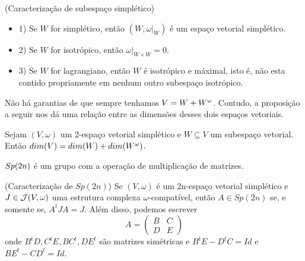\documentclass{beamer}
\begin{document}
\begin{frame}
	\begin{lema}
		(Caracterização de subespaço simplético)
	\end{lema}
	\begin{itemize}
		\item 1) Se $W$ for simplético, então $(W, \omega|_{W})$ é um espaço vetorial simplético.
		
		\item 2) Se $W$ for isotrópico, então $\omega|_{W\times W} = 0$.
		
		\item 3) Se $W$ for lagrangiano, então $W$ é isotrópico e máximal, isto é, não esta contido propriamente em nenhum outro subespaço isotrópico. 
	\end{itemize}
	Não há garantias de que sempre tenhamos $V = W + W^{\omega}$. Contudo, a proposição a seguir nos dá uma relação entre as dimensões desses dois espaços vetoriais.
	
	\begin{proposicao}
		Sejam $(V,\omega)$ um 2-espaço vetorial simplético e $W \subseteq V$ um subespaço vetorial. Então $dim(V) = dim(W) + dim(W^{\omega})$.
	\end{proposicao}
\end{frame}

\begin{frame}
	\begin{proposicao}
		$Sp(2n)$ é um grupo com a operação de multiplicação de matrizes.
	\end{proposicao}
	
	\begin{lema}
		(Caracterização de $Sp(2n)$) Se $(V, \omega)$ é um 2n-espaço vetorial simplético e $J \in \mathcal{J}(V, \omega)$ uma estrutura complexa $\omega$-compatível, então $A\in Sp(2n)$ se, e somente se, $A^{t}JA = J$. Além disso, podemos escrever 
		$$
		A=
		\left(
		\begin{array}{cc}
		B & C
		\\
		D & E
		\end{array}
		\right)
		$$
		onde $B^{t}D, C^{t}E, BC^{t}, DE^{t} $ são matrizes simétricas e $B^{t}E - D^{t}C = Id$ e $BE^{t} - CD^{t} = Id$.
	\end{lema}
\end{frame}
\end{document}
